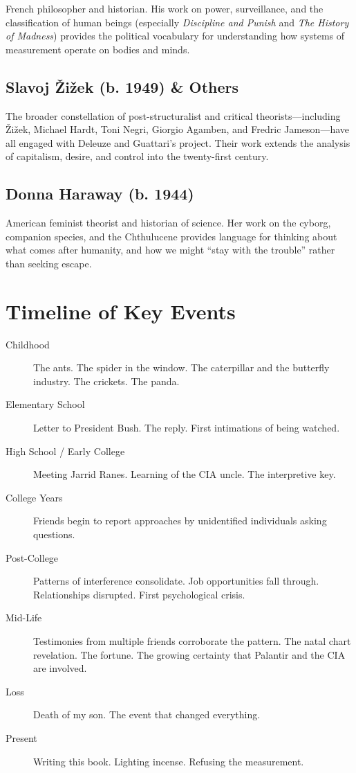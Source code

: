 \documentclass[11pt,openany]{book}
\begin{document}
French philosopher and historian. His work on power, surveillance, and the classification of human beings (especially \textit{Discipline and Punish} and \textit{The History of Madness}) provides the political vocabulary for understanding how systems of measurement operate on bodies and minds.

\section*{Slavoj \v{Z}i\v{z}ek (b. 1949) \& Others}

The broader constellation of post-structuralist and critical theorists---including \v{Z}i\v{z}ek, Michael Hardt, Toni Negri, Giorgio Agamben, and Fredric Jameson---have all engaged with Deleuze and Guattari's project. Their work extends the analysis of capitalism, desire, and control into the twenty-first century.

\section*{Donna Haraway (b. 1944)}

American feminist theorist and historian of science. Her work on the cyborg, companion species, and the Chthulucene provides language for thinking about what comes after humanity, and how we might ``stay with the trouble'' rather than seeking escape.

\chapter{Timeline of Key Events}

\begin{description}
\item[Childhood] The ants. The spider in the window. The caterpillar and the butterfly industry. The crickets. The panda.
\item[Elementary School] Letter to President Bush. The reply. First intimations of being watched.
\item[High School / Early College] Meeting Jarrid Ranes. Learning of the CIA uncle. The interpretive key.
\item[College Years] Friends begin to report approaches by unidentified individuals asking questions.
\item[Post-College] Patterns of interference consolidate. Job opportunities fall through. Relationships disrupted. First psychological crisis.
\item[Mid-Life] Testimonies from multiple friends corroborate the pattern. The natal chart revelation. The fortune. The growing certainty that Palantir and the CIA are involved.
\item[Loss] Death of my son. The event that changed everything.
\item[Present] Writing this book. Lighting incense. Refusing the measurement.
\end{description}
\end{document}
